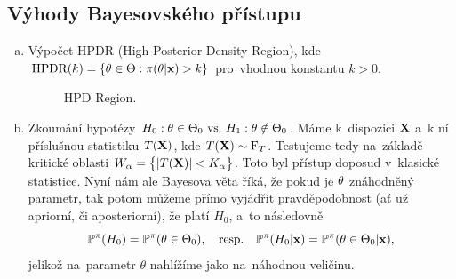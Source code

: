 	\subsection*{Výhody Bayesovského přístupu}
\begin{enumerate}[a)]
	\item Výpočet HPDR (High Posterior Density Region), kde $\mathrm{HPDR}(k)=\{\theta\in\Theta:\pi(\theta|\textbf{x})>k\}$ pro~vhodnou konstantu $k>0$.

	\begin{figure}[h]
		\centering
		\caption{HPD Region.}
	\end{figure}
	
	\item Zkoumání hypotézy $H_0: \theta\in\Theta_0 ~\text{vs.}~ H_1: \theta\notin\Theta_0$. Máme k~dispozici $\textbf{X}$ a~k ní příslušnou statistiku $T(\textbf{X})$, kde $T(\textbf{X})\sim\mathrm{F}_T$. Testujeme tedy na~základě kritické oblasti $W_\alpha=\big\{ |T(\textbf{X})|<K_\alpha \big\}$. Toto byl přístup doposud v~klasické statistice. Nyní nám ale Bayesova věta říká, že pokud je $\theta$ znáhodněný parametr, tak potom můžeme přímo vyjádřit pravděpodobnost (ať už apriorní, či aposteriorní), že platí $H_0$, a~to následovně
	$$\mathbb{P}^\pi(H_0) = \mathbb{P}^\pi(\theta \in \Theta_0),\quad\text{resp.}\quad \mathbb{P}^\pi(H_0|\textbf{x})=\mathbb{P}^\pi(\theta\in\Theta_0|\textbf{x}),$$
	jelikož na~parametr $\theta$ nahlížíme jako na~náhodnou veličinu.

\end{enumerate}